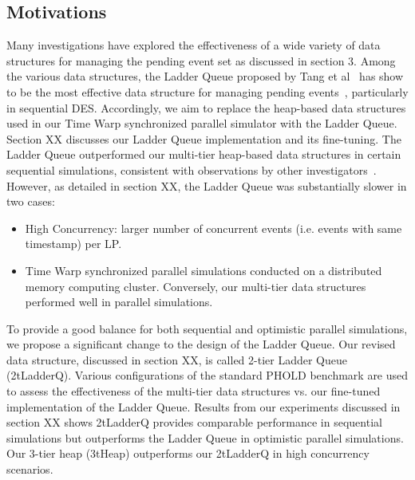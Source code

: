\subsection{Motivations}
Many investigations have explored the effectiveness of a wide variety of data structures for managing the pending event set as discussed in section 3. Among the various data structures, the Ladder Queue proposed by Tang et al~\cite{tang-05} has show to be the most effective data structure for managing pending events~\cite{dickman-13,franceschini-15}, particularly in sequential DES. Accordingly, we aim to replace the heap-based data structures used in our Time Warp synchronized parallel simulator with the Ladder Queue. Section XX discusses our Ladder Queue implementation and its fine-tuning.
	The Ladder Queue outperformed our multi-tier heap-based data structures in certain sequential simulations, consistent with observations by other investigators~\cite{franceschini-15,yeom-14}. However, as detailed in section XX, the Ladder Queue was substantially slower in two cases:
\begin{itemize}
\item High Concurrency: larger number of concurrent events (i.e. events with same timestamp) per LP.
\item Time Warp synchronized parallel simulations conducted on a distributed memory computing cluster. Conversely, our multi-tier data structures performed well in parallel simulations.
\end{itemize}

	To provide a good balance for both sequential and optimistic parallel simulations, we propose a significant change to the design of the Ladder Queue. Our revised data structure, discussed in section XX, is called 2-tier Ladder Queue (2tLadderQ). Various configurations of the standard PHOLD benchmark are used to assess the effectiveness of the multi-tier data structures vs. our fine-tuned implementation of the Ladder Queue. Results from our experiments discussed in section XX shows 2tLadderQ provides comparable performance in sequential simulations but outperforms the Ladder Queue in optimistic parallel simulations. Our 3-tier heap (3tHeap) outperforms our 2tLadderQ in high concurrency scenarios.
    

    